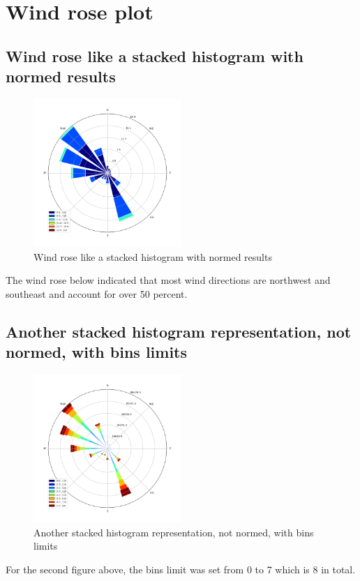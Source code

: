 \documentclass[10pt]{report}
\begin{document}
\section{Wind rose plot}
 \subsection{Wind rose like a stacked histogram with normed results}
 \begin{figure}[h!]
    \centering
    \includegraphics[width=0.50\textwidth]{images/figure2.png}
    \caption{Wind rose like a stacked histogram with normed results}
    \label{fig: PaleBlueDot}    
\end{figure}
The wind rose below indicated that most wind directions are northwest and southeast and account for over 50 percent.

 \subsection{Another stacked histogram representation, not normed, with bins limits}
 \begin{figure}[h!]
    \centering
    \includegraphics[width=0.50\textwidth]{images/figure3.png}
    \caption{Another stacked histogram representation, not normed, with bins limits}
    \label{fig: PaleBlueDot}    
\end{figure}
For the second figure above, the bins limit was set from 0 to 7 which is 8 in total.
\end{document}
